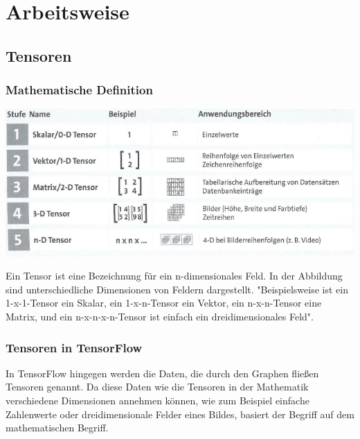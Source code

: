 \chapter{Arbeitsweise}
\label{chap:arbeitsweise}
\section{Tensoren}
\label{sec:tensoren}
\printsubchapterauthor{\authorNiklas}

\subsection{Mathematische Definition}
\label{sec:mathematischeDefinition}
\begin{center}
\includegraphics[width=.6\textwidth]{../abbildungen/5-9.pdf}
	\label{fig:tensoren}
\end{center}

Ein Tensor ist eine Bezeichnung für ein n-dimensionales Feld. In der Abbildung sind unterschiedliche Dimensionen von Feldern dargestellt. "Beispielsweise ist ein 1-x-1-Tensor ein Skalar, ein 1-x-n-Tensor ein Vektor, ein n-x-n-Tensor eine Matrix, und ein n-x-n-x-n-Tensor ist einfach ein dreidimensionales Feld"\citep{Einfuehrung}.

\subsection{Tensoren in TensorFlow}
\label{sec:tensorenInTensorflow}
In TensorFlow hingegen werden die Daten, die durch den Graphen fließen Tensoren genannt. Da diese Daten wie die Tensoren in der Mathematik verschiedene Dimensionen annehmen können, wie zum Beispiel einfache Zahlenwerte oder dreidimensionale Felder eines Bildes, basiert der Begriff auf dem mathematischen Begriff. 

